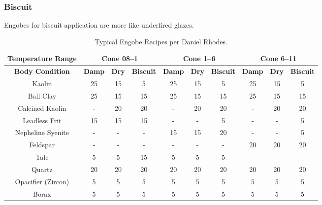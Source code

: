 \subsubsection{Biscuit}
Engobes for biscuit application are more like underfired glazes.
\begin{landscape}
\begin{center}
  \renewcommand{\arraystretch}{1.5}
  \begin{table}\centering
    \begin{tabular}{|c||c|c|c||c|c|c||c|c|c|}\hline
 \textbf{Temperature Range}
&\multicolumn{3}{c}{\textbf{Cone 08--1}}\vline
&\multicolumn{3}{c}{\textbf{Cone 1--6}}\vline
&\multicolumn{3}{c}{\textbf{Cone 6--11}}\vline\\\hline\hline
      
\textbf{Body Condition}
&\textbf{Damp}&\textbf{Dry}&\textbf{Biscuit}
&\textbf{Damp}&\textbf{Dry}&\textbf{Biscuit}
&\textbf{Damp}&\textbf{Dry}&\textbf{Biscuit}\\\hline\hline
Kaolin&25&15&5&25&15&5&25&15&5\\\hline
Ball Clay&25&15&15&25&15&15&25&15&15\\\hline
Calcined Kaolin&-&20&20&-&20&20&-&20&20\\\hline
Leadless Frit&15&15&15&-&-&5&-&-&5\\\hline
Nepheline Syenite&-&-&-&15&15&20&-&-&5\\\hline
Feldspar&-&-&-&-&-&-&20&20&20\\\hline
Talc&5&5&15&5&5&5&-&-&-\\\hline
Quartz&20&20&20&20&20&20&20&20&20\\\hline
Opacifier (Zircon)&5&5&5&5&5&5&5&5&5\\\hline
Borax&5&5&5&5&5&5&5&5&5\\\hline
\end{tabular}
\caption{Typical Engobe Recipes per Daniel Rhodes.}
\label{tab:engoberecipes}
\end{table}
\end{center}
\end{landscape}
